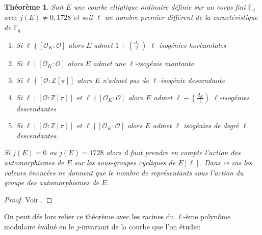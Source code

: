 \documentclass[10pt,a4paper]{book}
\theoremstyle{plain}
\newtheorem{thm}{Théorème}[chapter]
\theoremstyle{definition}
\theoremstyle{definition}
\theoremstyle{definition}
\theoremstyle{definition}
\theoremstyle{definition}
\theoremstyle{remark}
\theoremstyle{remark}
\theoremstyle{definition}
\begin{document}
\begin{thm}
\label{thm:Koh:cas}
Soit $E$ une courbe elliptique ordinaire définie sur un corps fini 
$\mathbb{F}_q$ avec $j(E)\neq 0, 1728$ et soit $\ell$ un nombre premier 
différent de la caractéristique de $\mathbb{F}_q$
\begin{enumerate}
\item Si $\ell \nmid [\mathcal{O}_K : \mathcal{O}]$ alors $E$ admet $ 1 + \left( \frac{d_K}{\ell} \right)$ $\ell$-isogénies horizontales
\item Si $\ell \mid [\mathcal{O}_K : \mathcal{O}]$ alors $E$ admet une $\ell$-isogénie montante
\item Si $\ell \nmid [\mathcal{O} : \mathbb{Z}[\pi]]$ alors $E$ n'admet pas de $\ell$-isogénie descendante
\item Si $\ell \mid [\mathcal{O} : \mathbb{Z}[\pi]]$ et $\ell \nmid [\mathcal{O}_K : \mathcal{O}]$ alors $E$ admet $\ell-\left( \frac{d_K}{\ell} \right)$ $\ell$-isogénies descendantes
\item  Si $\ell \mid [\mathcal{O} : \mathbb{Z}[\pi]]$ et $\ell \mid [\mathcal{O}_K : \mathcal{O}]$ alors $E$ admet $\ell$ isogénies de degré $\ell$ descendantes.
\end{enumerate}
Si $j(E)=0$ ou $j(E)=1728$ alors il faut prendre en compte l'action des 
automorphismes de $E$ sur les sous-groupes cycliques de $E[\ell]$. Dans ce cas
les valeurs énoncées ne donnent que le nombre de représentants 
sous l'action du groupe des automorphismes de $E$.
\end{thm}

\begin{proof}
Voir \cite[Proposition 23]{Kohel96}.
\end{proof}

On peut dés lors relier ce théorème avec les racines du $\ell$-ème polynôme modulaire évalué en le $j$-invariant de la courbe que l'on étudie:
\end{document}
